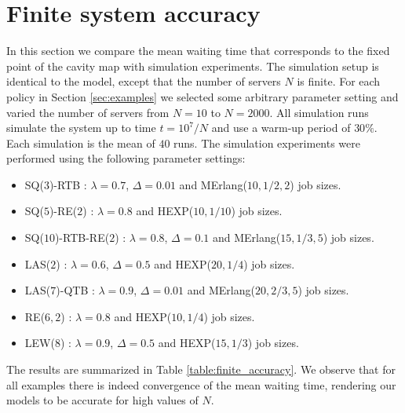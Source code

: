 \documentclass[12pt]{report}
\begin{document}
\section{Finite system accuracy} \label{sec:finiteAccuracy}

In this section we compare the mean waiting time that corresponds to the
fixed point of the cavity map with simulation experiments. The simulation setup
is identical to the model, except that the number of servers $N$ is finite.  
For each policy in Section \ref{sec:examples} we selected some arbitrary
parameter setting and varied the number of servers from $N=10$ to
$N=2000$. All simulation runs simulate the system up to time $t=10^7/N$ and use a warm-up period of $30\%$. Each simulation is the mean of $40$ runs. The simulation experiments were performed using the following parameter settings:
\begin{itemize}
\item SQ($3$)-RTB : $\lambda = 0.7$, $\Delta=0.01$ and MErlang($10, 1/2, 2$) job sizes.
\item SQ($5$)-RE($2$) : $\lambda = 0.8$ and HEXP($10, 1/10$) job sizes.
\item SQ($10$)-RTB-RE($2$) : $\lambda = 0.8$, $\Delta=0.1$ and MErlang($15, 1/3, 5$) job sizes.
\item LAS($2$) : $\lambda = 0.6$, $\Delta=0.5$ and HEXP($20, 1/4$) job sizes.
\item LAS($7$)-QTB : $\lambda = 0.9$, $\Delta=0.01$ and MErlang($20, 2/3, 5$) job sizes.
\item RE($6, 2$) : $\lambda = 0.8$ and HEXP($10,1/4$) job sizes.
\item LEW($8$) : $\lambda = 0.9$, $\Delta=0.5$ and HEXP($15, 1/3$) job sizes.
\end{itemize}
The results are summarized in Table \ref{table:finite_accuracy}. We observe that for all examples there is indeed convergence of the mean waiting time, rendering our models to be accurate for high values of $N$.
\end{document}
